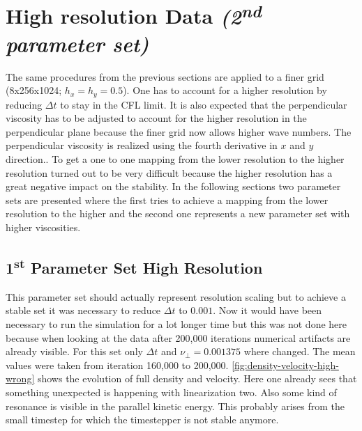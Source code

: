 \documentclass[master.tex]{subfiles}
\begin{document}
\section{High resolution Data \textit{(2\textsuperscript{nd} parameter set)}}
The same procedures from the previous sections are applied to a finer grid (8x256x1024; $h_x = h_y = 0.5$). One has to account for a higher resolution by reducing $\Delta t$ to stay in the \ac{CFL} limit. It is also expected that the perpendicular viscosity has to be adjusted to account for the higher resolution in the perpendicular plane because the finer grid now allows higher wave numbers. \newline
{}The perpendicular viscosity is realized using the fourth derivative in $x$ and $y$ direction.. \newline
To get a one to one mapping from the lower resolution to the higher resolution turned out to be very difficult because the higher resolution has a great negative impact on the stability. In the following sections two parameter sets are presented where the first tries to achieve a mapping from the lower resolution to the higher and the second one represents a new parameter set with higher viscosities.

\subsection{1\textsuperscript{st} Parameter Set High Resolution}
This parameter set should actually represent resolution scaling but to achieve a stable set it was necessary to reduce $\Delta t$ to $0.001$. Now it would have been necessary to run the simulation for a lot longer time but this was not done here because when looking at the data after 200,000 iterations numerical artifacts are already visible.\newline
For this set only $\Delta t$ and $\nu_\perp = 0.001375$ where changed.\newline
The mean values were taken from iteration 160,000 to 200,000.
\autoref{fig:density-velocity-high-wrong} shows the evolution of full density and velocity. Here one already sees that something unexpected is happening with linearization two. Also some kind of resonance is visible in the parallel kinetic energy. This probably arises from the small timestep for which the timestepper is not stable anymore.
\end{document}
